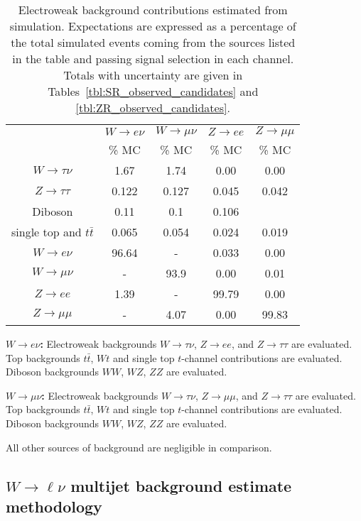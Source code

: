 \begin{table}[h]
\begin{center}
 \begin{tabular}{ c | c | c | c | c } 
 & $W \rightarrow e\nu$ &  $W \rightarrow \mu\nu$ &  $Z \rightarrow ee$ & $Z \rightarrow \mu\mu$ \\
 & \% MC & \% MC & \% MC & \% MC \\
 \hline
  $W \rightarrow \tau\nu$ & 1.67 & 1.74 & 0.00 & 0.00 \\
  $Z \rightarrow \tau\tau$ & 0.122 & 0.127 & 0.045 & 0.042 \\
  Diboson & 0.11 & 0.1 &  0.106 & \\
  single top and $t\bar{t}$ & 0.065 & 0.054 & 0.024 & 0.019 \\
  $W \rightarrow e\nu$ & 96.64 & - & 0.033 & 0.00 \\
  $W \rightarrow \mu\nu$ & - & 93.9 & 0.00 & 0.01 \\
  $Z \rightarrow ee$ & 1.39 & - & 99.79 & 0.00 \\
  $Z \rightarrow \mu\mu$ & - & 4.07 & 0.00 & 99.83 \\
 \hline 
\end{tabular}
\caption{
Electroweak background contributions estimated from simulation. 
Expectations are expressed as a percentage of the total simulated events coming from the sources listed in the table and passing signal selection in each channel. 
Totals with uncertainty are given in Tables~\ref{tbl:SR_observed_candidates} and \ref{tbl:ZR_observed_candidates}.
}%
\label{tbl:ewk_bkg_SR}
\end{center}
\end{table}

\textbf{$W \rightarrow e\nu$:} Electroweak backgrounds $W \rightarrow \tau\nu$, $Z \rightarrow ee$, and $Z \rightarrow \tau\tau$ are evaluated.
Top backgrounds $t\bar{t}$, $Wt$ and single top $t$-channel contributions are evaluated.
Diboson backgrounds $WW$, $WZ$, $ZZ$ are evaluated.

\textbf{$W \rightarrow \mu\nu$:} Electroweak backgrounds $W \rightarrow \tau\nu$, $Z \rightarrow \mu\mu$, and $Z \rightarrow \tau\tau$ are evaluated.
Top backgrounds $t\bar{t}$, $Wt$ and single top $t$-channel contributions are evaluated.
Diboson backgrounds $WW$, $WZ$, $ZZ$ are evaluated.

All other sources of background are negligible in comparison.

\subsection{$W\rightarrow\ell\nu$ multijet background estimate methodology}
\label{sec:bkg_mj}

